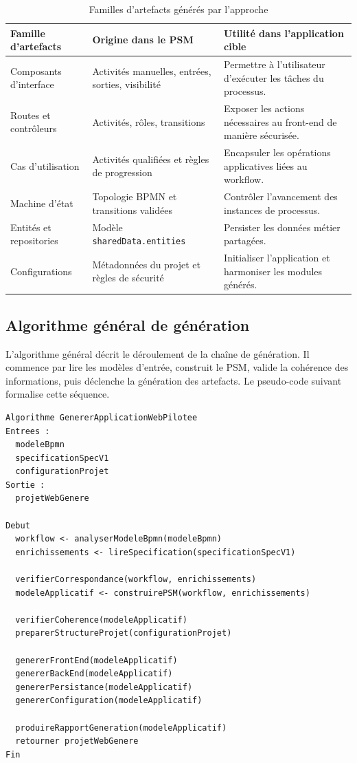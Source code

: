 \begin{table}[H]
\centering
\small
\caption{Familles d'artefacts générés par l'approche}
\label{tab:chap3-familles-artefacts}
\begin{tabular}{p{3.7cm}p{4.8cm}p{5.3cm}}
\hline
\textbf{Famille d'artefacts} & \textbf{Origine dans le PSM} & \textbf{Utilité dans l'application cible} \\
\hline
Composants d'interface & Activités manuelles, entrées, sorties, visibilité & Permettre à l'utilisateur d'exécuter les tâches du processus. \\
Routes et contrôleurs & Activités, rôles, transitions & Exposer les actions nécessaires au front-end de manière sécurisée. \\
Cas d'utilisation & Activités qualifiées et règles de progression & Encapsuler les opérations applicatives liées au workflow. \\
Machine d'état & Topologie BPMN et transitions validées & Contrôler l'avancement des instances de processus. \\
Entités et repositories & Modèle \texttt{sharedData.entities} & Persister les données métier partagées. \\
Configurations & Métadonnées du projet et règles de sécurité & Initialiser l'application et harmoniser les modules générés. \\
\hline
\end{tabular}
\end{table}

\subsection{Algorithme général de génération}

L'algorithme général décrit le déroulement de la chaîne de génération. Il commence par lire les modèles d'entrée, construit le PSM, valide la cohérence des informations, puis déclenche la génération des artefacts. Le pseudo-code suivant formalise cette séquence.

\begin{lstlisting}[caption={Algorithme général de génération},label={lst:chap3-algorithme-generation}]
Algorithme GenererApplicationWebPilotee
Entrees :
  modeleBpmn
  specificationSpecV1
  configurationProjet
Sortie :
  projetWebGenere

Debut
  workflow <- analyserModeleBpmn(modeleBpmn)
  enrichissements <- lireSpecification(specificationSpecV1)

  verifierCorrespondance(workflow, enrichissements)
  modeleApplicatif <- construirePSM(workflow, enrichissements)

  verifierCoherence(modeleApplicatif)
  preparerStructureProjet(configurationProjet)

  genererFrontEnd(modeleApplicatif)
  genererBackEnd(modeleApplicatif)
  genererPersistance(modeleApplicatif)
  genererConfiguration(modeleApplicatif)

  produireRapportGeneration(modeleApplicatif)
  retourner projetWebGenere
Fin
\end{lstlisting}

